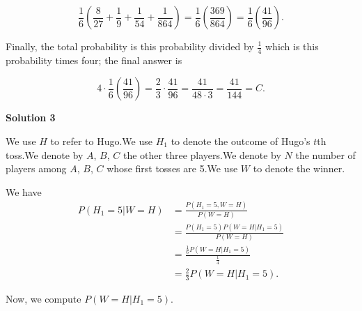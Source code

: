 \begin{enumerate}
 
 \[\frac{1}{6}\left(\frac{8}{27} + \frac{1}{9} + \frac{1}{54} + \frac{1}{864}\right) = \frac{1}{6}\left(\frac{369}{864}\right) = \frac{1}{6}\left(\frac{41}{96}\right).\]

 Finally, the total probability is this probability divided by $\frac{1}{4}$ which is this probability times four; the final answer is

 
 \[4 \cdot \frac{1}{6}\left(\frac{41}{96}\right) = \frac{2}{3} \cdot \frac{41}{96} = \frac{41}{48 \cdot 3} = \frac{41}{144} = \boxed{C}.\]




\textbf{Solution 3}

We use $H$ to refer to Hugo.We use $H_1$ to denote the outcome of Hugo's $t$th toss.We denote by $A$, $B$, $C$ the other three players.We denote by $N$ the number of players among $A$, $B$, $C$ whose first tosses are 5.We use $W$ to denote the winner.

 We have
 \begin{align*} P \left( H_1 = 5 | W = H \right) & = \frac{P \left( H_1 = 5 , W = H \right)}{P \left( W = H \right)} \\ & = \frac{P \left( H_1 = 5 \right) P \left( W = H | H_1 = 5 \right) }{P \left( W = H \right)} \\ & = \frac{\frac{1}{6} P \left( W = H | H_1 = 5 \right)}{\frac{1}{4}} \\ & = \frac{2}{3} P \left( W = H | H_1 = 5 \right) . \end{align*}


 Now, we compute $P \left( W = H | H_1 = 5 \right)$.


\end{enumerate}
